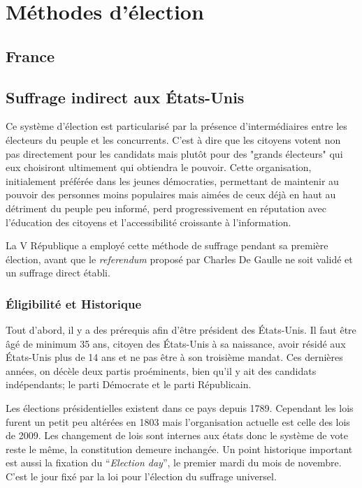 \documentclass[12pt,a4paper]{report}
\begin{document}

\chapter{Méthodes d'élection}
\section{France} %

\section{Suffrage indirect aux États-Unis}

Ce système d'élection est particularisé par la présence d'intermédiaires entre les électeurs du peuple et les concurrents. 
C'est à dire que les citoyens votent non pas directement pour les candidats mais plutôt pour des "grands électeurs" qui eux choisiront ultimement qui obtiendra le pouvoir.
Cette organisation, initialement préférée dans les jeunes démocraties, permettant de maintenir au pouvoir des personnes moins populaires mais aimées de ceux déjà en haut au détriment du peuple peu informé, perd progressivement en réputation avec l'éducation des citoyens et l'accessibilité croissante à l'information.
\nocite{wiki:scrutinindir}

La V République a employé cette méthode de suffrage pendant sa première élection, avant que le \textit{referendum} proposé par Charles De Gaulle ne soit validé et un suffrage direct établi. \nocite{polmania:scrutins}

\subsection{Éligibilité et Historique}

Tout d’abord, il y a des prérequis afin d’être président des États-Unis.
Il faut être âgé de minimum 35 ans, citoyen des États-Unis à sa naissance, avoir résidé aux États-Unis plus de 14 ans et ne pas être à son troisième mandat.
Ces dernières années, on décèle deux partis proéminents, bien qu'il y ait des candidats indépendants; le parti Démocrate et le parti Républicain.

Les élections présidentielles existent dans ce pays depuis 1789.
Cependant les lois furent un petit peu altérées en 1803 mais l'organisation actuelle est celle des lois de 2009.
Les changement de lois sont internes aux états donc le système de vote reste le même, la constitution demeure inchangée.
Un point historique important est aussi la fixation du “\textit{Election day}”, le premier mardi du mois de novembre.
C’est le jour fixé par la loi pour l'élection du suffrage universel.
\end{document}

